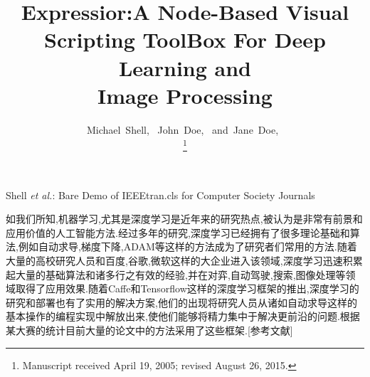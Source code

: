 \documentclass[10pt,journal,compsoc,UTF8]{IEEEtran}
\begin{document}
\title{Expressior:A Node-Based Visual Scripting ToolBox For Deep Learning and \\Image Processing}

\author{Michael~Shell,~
        John~Doe,~
        and~Jane~Doe,~%

\thanks{Manuscript received April 19, 2005; revised August 26, 2015.}}


%
{Shell \MakeLowercase{\textit{et al.}}: Bare Demo of IEEEtran.cls for Computer Society Journals}



\maketitle

\IEEEdisplaynontitleabstractindextext

\IEEEpeerreviewmaketitle
如我们所知,机器学习,尤其是深度学习是近年来的研究热点,被认为是非常有前景和应用价值的人工智能方法.经过多年的研究,深度学习已经拥有了很多理论基础和算法,例如自动求导,梯度下降,ADAM等这样的方法成为了研究者们常用的方法.随着大量的高校研究人员和百度,谷歌,微软这样的大企业进入该领域,深度学习迅速积累起大量的基础算法和诸多行之有效的经验,并在对弈,自动驾驶,搜索,图像处理等领域取得了应用效果.随着Caffe和Tensorflow这样的深度学习框架的推出,深度学习的研究和部署也有了实用的解决方案,他们的出现将研究人员从诸如自动求导这样的基本操作的编程实现中解放出来,使他们能够将精力集中于解决更前沿的问题.根据某大赛的统计目前大量的论文中的方法采用了这些框架.[参考文献]
\end{document}

